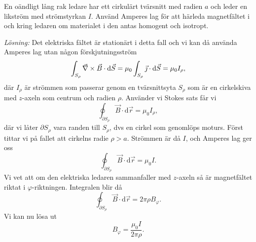 \documentclass[%
oneside,                 %
final,                   %
10pt]{article}
\newenvironment{notice_mdfboxadmon}[1][]{
\begin{notice_mdfboxmdframed}[frametitle=#1]
}
{
\end{notice_mdfboxmdframed}
}
\begin{document}
\begin{notice_mdfboxadmon}

En oändligt lång rak ledare har ett cirkulärt tvärsnitt med radien
$a$ och leder en likström med strömstyrkan $I$.  Använd Amperes lag 
för att härleda magnetfältet i och kring ledaren om materialet i den
antas homogent och isotropt.


\vspace{3mm}


\emph{Lösning:}  Det elektriska fältet är stationärt i detta fall och vi kan då använda Amperes lag utan någon förskjutningsström
\begin{equation}
  \int_{S_\rho} \vec{\nabla} \times \vec{B} \cdot \mbox{d}\vec{S} = \mu_0 \int_{S_\rho} \vec{\jmath} \cdot \mbox{d}\vec{S} = \mu_0 I_\rho,
\end{equation}
där $I_\rho$ är strömmen som passerar genom en tvärsnittsyta $S_\rho$ som är en cirkelskiva med $z$-axeln som centrum och radien $\rho$. Använder vi Stokes sats får vi
\begin{equation}
  \oint_{\partial S_\rho} \vec{B} \cdot \mbox{d}\vec{r} = \mu_0 I_\rho,
\end{equation}
där vi låter $\partial S_\rho$ vara randen till $S_\rho$, dvs en cirkel som genomlöps moturs. Först 
tittar vi på fallet att cirkelns radie $\rho > a$.  Strömmen 
är då $I$, och Amperes lag ger oss
\begin{equation}
  \oint_{\partial S_\rho} \vec{B} \cdot \mbox{d}\vec{r} = \mu_0 I.
\end{equation}
Vi vet att om den elektriska ledaren sammanfaller med  $z$-axeln så är magnetfältet riktat i $\varphi$-riktningen.
Integralen blir då
\begin{equation}
  \oint_{\partial S_\rho} \vec{B} \cdot \mbox{d}\vec{r} = 2\pi \rho B_\varphi.
\end{equation}
Vi kan nu lösa ut
\begin{equation}
  B_\varphi = \frac{\mu_0 I}{2\pi \rho}.
\end{equation}


\end{notice_mdfboxadmon}
\end{document}
